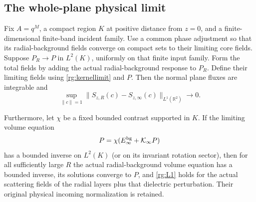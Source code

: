 \subsection{The whole-plane physical limit}

\begin{theorem}
\label{rg:physical-limit}
Fix $A=q^M$, a compact region $K$ at positive distance from
$z=0$, and a finite-dimensional finite-band incident family.
Use a common phase adjustment so that its radial-background
fields converge on compact sets to their limiting core fields.
Suppose $P_R\to P$ in $L^2(K)$, uniformly on that finite
input family. Form the total fields by adding the actual
radial-background response to $P_R$. Define their limiting
fields using \eqref{rg:kernellimit} and $P$. Then the normal
plane fluxes are integrable and
\begin{equation}\label{rg:L1}
 \sup_{\|c\|=1}\|S_{z,R}(c)-S_{z,\infty}(c)\|_{L^1(\mathbb R^2)}
          \longrightarrow0 .
\end{equation}

Furthermore, let $\chi$ be a fixed bounded contrast supported
in $K$. If the limiting volume equation
\begin{equation}\label{rg:volume}
 P=\chi(E_\infty^{\rm bg}+{\cal K}_\infty P)
\end{equation}
has a bounded inverse on $L^2(K)$ (or on its invariant
rotation sector), then for all sufficiently large $R$ the
actual radial-background volume equation has a bounded
inverse, its solutions converge to $P$, and \eqref{rg:L1}
holds for the actual scattering fields of the radial layers
plus that dielectric perturbation. Their original physical
incoming normalization is retained.
\end{theorem}
